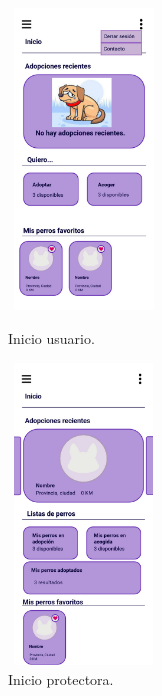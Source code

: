 \documentclass[a4paper, 12pt]{article}
\begin{document}
\begin{figure}[H]
   	\begin{minipage}{0.48\textwidth}
		\begin{center}
			{\includegraphics[height=8cm, width=4cm]{design/UserPage.jpg}\par}
			\caption{Inicio usuario.}
			\medskip
			\small

		\end{center}  
	\end{minipage}\hfill
   	\begin{minipage}{0.48\textwidth}
		\begin{center}
			{\includegraphics[height=8cm, width=4cm]{design/CompanyPage.jpg}\par}
			\caption{Inicio protectora.}
			\medskip			
		\end{center}  
	\end{minipage}\hfill
\end{figure}
\end{document}
